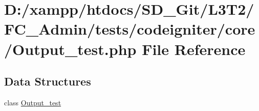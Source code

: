 \hypertarget{_output__test_8php}{}\section{D\+:/xampp/htdocs/\+S\+D\+\_\+\+Git/\+L3\+T2/\+F\+C\+\_\+\+Admin/tests/codeigniter/core/\+Output\+\_\+test.php File Reference}
\label{_output__test_8php}
\subsection*{Data Structures}
\begin{DoxyCompactItemize}
\item 
class \hyperlink{class_output__test}{Output\+\_\+test}
\end{DoxyCompactItemize}
